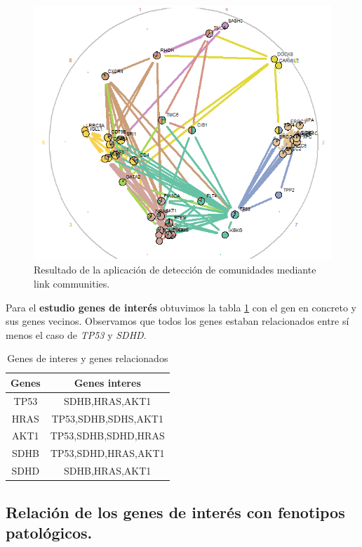\begin{figure}
	\centering
	\includegraphics[width=0.8\linewidth]{figures/link}
	\caption{Resultado de la aplicación de detección de comunidades mediante link communities.}
	\label{fig:link}
\end{figure}



Para el \textbf{estudio genes de interés} obtuvimos la tabla \ref{tab:genesinteres} con el gen en concreto y sus genes vecinos. Observamos que todos los genes estaban relacionados entre sí menos el caso de \textit{TP53} y \textit{SDHD}. 

\begin{table}[h]
	\centering
	\caption{Genes de interes y genes relacionados}
	\begin{tabular}{|c|c|}
		\hline
		\textbf{Genes} & \textbf{Genes interes} \\
		\hline
		TP53 & SDHB,HRAS,AKT1 \\
		\hline
		HRAS & TP53,SDHB,SDHS,AKT1 \\
		\hline
		AKT1 & TP53,SDHB,SDHD,HRAS \\
		\hline
		SDHB & TP53,SDHD,HRAS,AKT1 \\
		\hline
		SDHD & SDHB,HRAS,AKT1 \\
		\hline
	\end{tabular}
	\label{tab:genesinteres}
\end{table}

\clearpage

\subsection{Relación de los genes de interés con fenotipos patológicos.}

